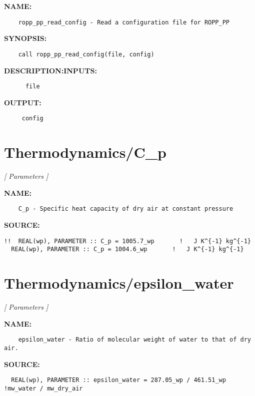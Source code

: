 \label{ch:robo95}
\label{ch:Setup_ropp_pp_read_config}
\textbf{NAME:}\hspace{0.08in}\begin{Verbatim}
    ropp_pp_read_config - Read a configuration file for ROPP_PP
\end{Verbatim}
\textbf{SYNOPSIS:}\hspace{0.08in}\begin{Verbatim}
    call ropp_pp_read_config(file, config)
\end{Verbatim}
\textbf{DESCRIPTION:}\hspace{0.08in}\textbf{INPUTS:}\hspace{0.08in}\begin{Verbatim}
      file
\end{Verbatim}
\textbf{OUTPUT:}\hspace{0.08in}\begin{Verbatim}
     config
\end{Verbatim}
\section{Thermodynamics/C\_p}
\textsl{[ Parameters ]}

\label{ch:robo96}
\label{ch:Thermodynamics_C_p}
\textbf{NAME:}\hspace{0.08in}\begin{Verbatim}
    C_p - Specific heat capacity of dry air at constant pressure
\end{Verbatim}
\textbf{SOURCE:}\hspace{0.08in}\begin{Verbatim}
!!  REAL(wp), PARAMETER :: C_p = 1005.7_wp       !   J K^{-1} kg^{-1}
  REAL(wp), PARAMETER :: C_p = 1004.6_wp       !   J K^{-1} kg^{-1}
\end{Verbatim}
\section{Thermodynamics/epsilon\_water}
\textsl{[ Parameters ]}

\label{ch:robo97}
\label{ch:Thermodynamics_epsilon_water}
\textbf{NAME:}\hspace{0.08in}\begin{Verbatim}
    epsilon_water - Ratio of molecular weight of water to that of dry air.
\end{Verbatim}
\textbf{SOURCE:}\hspace{0.08in}\begin{Verbatim}
  REAL(wp), PARAMETER :: epsilon_water = 287.05_wp / 461.51_wp  !mw_water / mw_dry_air
\end{Verbatim}
